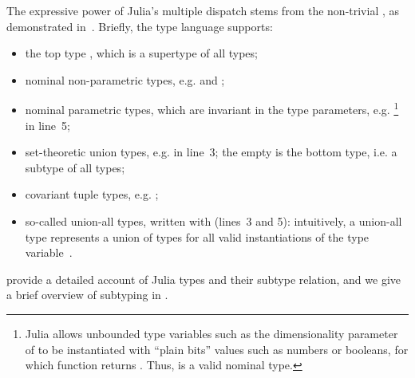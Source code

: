The expressive power of Julia's multiple dispatch stems from 
the non-trivial , as
demonstrated in~.
Briefly, the type language supports:
\begin{itemize}
  \item the top type , which is a supertype of all types;
  \item nominal non-parametric types, e.g.  and ;
  \item nominal parametric types, which are invariant in the type parameters, 
        e.g. \footnote{Julia allows unbounded type
        variables such as the dimensionality parameter  
        of 
        to be instantiated with ``plain bits'' values such as numbers or
        booleans, for which
        \href{https://docs.julialang.org/en/v1/base/base/\#Base.isbits}{}
        function returns .
        Thus,  is a valid nominal type.}
        in line~5;
  \item set-theoretic union types, e.g. 
     in line~3;
    the empty  is the bottom type, i.e. a subtype
    of all types;
  \item covariant tuple types, e.g. ;
  \item so-called union-all types, written with  (lines~3 and 5):
    intuitively, a union-all type  represents a union of types
     for all valid instantiations  of the type
    variable~.
\end{itemize}
\citet{zappa-nardelli:julia-sub:oopsla:2018} provide a detailed
account of Julia types and their subtype relation, and we give a brief
overview of subtyping in .


